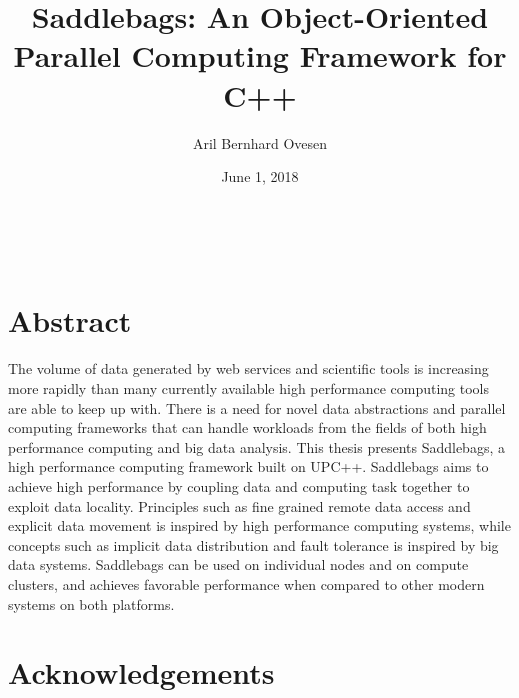 \documentclass{uit-report}
\begin{document}

\title{Saddlebags: An Object-Oriented Parallel Computing Framework for C++}
\author{Aril Bernhard Ovesen}
\date{June 1, 2018}



\newpage\
\pagestyle{empty}

\mbox{}

\pagebreak
{}
\pagestyle{firststyle}
\section*{Abstract}
The volume of data generated by web services and scientific tools is increasing more rapidly than many currently available high performance computing tools are able to keep up with. There is a need for novel data abstractions and parallel computing frameworks that can handle workloads from the fields of both high performance computing and big data analysis. This thesis presents Saddlebags, a high performance computing framework built on UPC++. Saddlebags aims to achieve high performance by coupling data and computing task together to exploit data locality. Principles such as fine grained remote data access and explicit data movement is inspired by high performance computing systems, while concepts such as implicit data distribution and fault tolerance is inspired by big data systems. Saddlebags can be used on individual nodes and on compute clusters, and achieves favorable performance when compared to other modern systems on both platforms.


\newpage
\section*{Acknowledgements}


\newpage
\tableofcontents
\pagebreak
\listoffigures
\pagebreak
\listoftables
\lstlistoflistings
\pagebreak
\pagestyle{empty}

\mbox{}

\newpage
{}
\pagestyle{secondstyle}
\setcounter{page}{1}
\end{document}
